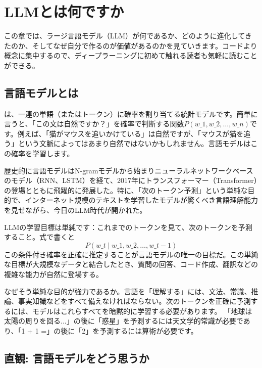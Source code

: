 \chapter{LLMとは何ですか}
\label{ch:intro}

この章では、ラージ言語モデル（LLM）が何であるか、どのように進化してきたのか、そしてなぜ自分で作るのが価値があるのか​​を見ていきます。コードより概念に集中するので、ディープラーニングに初めて触れる読者も気軽に読むことができる。

\section{言語モデルとは}

は、一連の単語（またはトークン）に確率を割り当てる統計モデルです。簡単に言うと、「この文は自然ですか？」を確率で判断する関数$P(w\_1, w\_2, \dots, w\_n)$です。例えば、「猫がマウスを追いかけている」は自然ですが、「マウスが猫を追う」という文脈によってはあまり自然ではないかもしれません。言語モデルはこの確率を学習します。

歴史的に言語モデルはN-gramモデルから始まりニューラルネットワークベースのモデル（RNN、LSTM）を経て、2017年にトランスフォーマー（Transformer）の登場とともに飛躍的に発展した。特に、「次のトークン予測」という単純な目的で、インターネット規模のテキストを学習したモデルが驚くべき言語理解能力を見せながら、今日のLLM時代が開かれた。

\begin{infobox}[次のトークン予測]
LLMの学習目標は単純です：これまでのトークンを見て、次のトークンを予測すること。式で書くと
\[
P(w\_t \mid w\_1, w\_2, \dots, w\_{t-1})
\]
この条件付き確率を正確に推定することが言語モデルの唯一の目標だ。この単純な目標が大規模なデータと結合したとき、質問の回答、コード作成、翻訳などの複雑な能力が自然に登場する。

なぜそう単純な目的が強力であるか。言語を「理解する」には、文法、常識、推論、事実知識などをすべて備えなければならない。次のトークンを正確に予測するには、モデルはこれらすべてを暗黙的に学習する必要があります。 「地球は太陽の周りを回る...」の後に「惑星」を予測するには天文学的常識が必要であり、「1 + 1 =」の後に「2」を予測するには算術が必要です。
\end{infobox}

\section{直観: 言語モデルをどう思うか}

